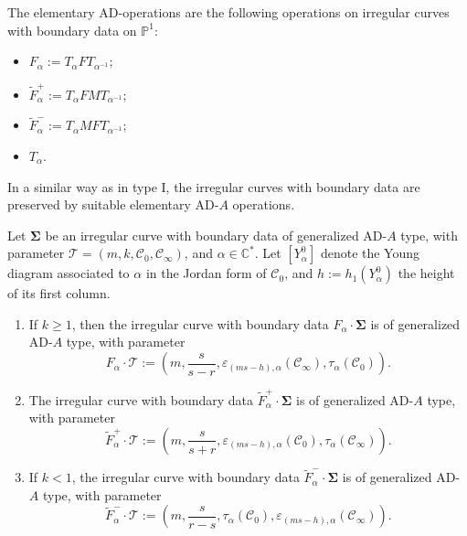 \documentclass[11pt,a4paper]{amsart}
\numberwithin{equation}{section}
\begin{document}
\begin{definition}
The elementary AD-operations are the following operations on irregular curves with boundary data on $\mathbb P^1$:
\begin{itemize}
\item $F_\alpha:=T_{\alpha}FT_{\alpha^{-1}}$;
\item $\widetilde F^+_\alpha:=T_{\alpha}FMT_{\alpha^{-1}}$;
\item $\widetilde F^-_\alpha:=T_{\alpha}MFT_{\alpha^{-1}}$;
\item $T_\alpha$.
\end{itemize}
\end{definition}

In a similar way as in type I, the irregular curves with boundary data are preserved by suitable elementary AD-$A$ operations.

\begin{proposition}
\label{prop:transf_parameter_elementary_transf_twist}
Let $\bm\Sigma$ be an irregular curve with boundary data of generalized  AD-$A$ type, with parameter $\mathcal T=(m,k,\mathcal C_0, \mathcal C_\infty)$, and $\alpha\in \mathbb C^*$. Let $[Y^0_\alpha]$ denote the Young diagram associated to $\alpha$ in the Jordan form of $\mathcal C_0$, and $h:=h_1(Y^0_\alpha)$ the height of its first column. 
\begin{enumerate}
\item If $k\geq 1$, then the irregular curve with boundary data $F_\alpha\cdot \bm\Sigma$ is  of generalized AD-$A$ type, with parameter
\begin{equation}
F_\alpha\cdot \mathcal T:=\left(m,\frac{s}{s-r},\varepsilon_{(ms-h),\alpha}(\mathcal C_{\infty}), \tau_\alpha(\mathcal C_0)\right).
\end{equation}
\item The irregular curve with boundary data $\widetilde F^+_\alpha\cdot \bm\Sigma$ is of generalized  AD-$A$ type, with parameter
\begin{equation}
\widetilde F^+_\alpha\cdot \mathcal T:=\left(m,\frac{s}{s+r},\varepsilon_{(ms-h),\alpha}(\mathcal C_{0}), \tau_\alpha(\mathcal C_\infty)\right) .
\end{equation}
\item If $k<1$, the irregular curve with boundary data $\widetilde F^-_\alpha\cdot \bm\Sigma$ is of  generalized AD-$A$ type, with parameter
\begin{equation}
\widetilde F^-_\alpha\cdot \mathcal T:=\left(m,\frac{s}{r-s},\tau_\alpha(\mathcal C_{0}), \varepsilon_{(ms-h),\alpha}(\mathcal C_\infty)\right).
\end{equation}
\end{enumerate}
\end{proposition}
\end{document}
